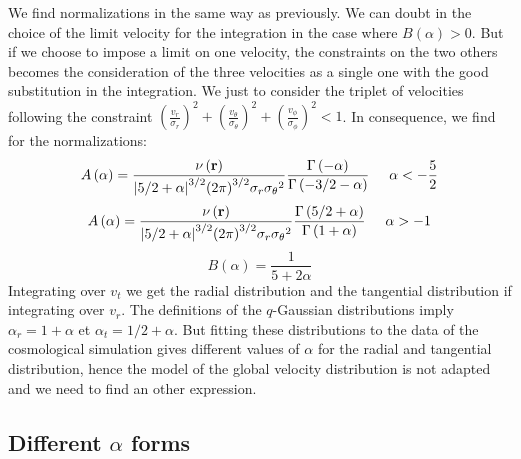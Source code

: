 We find normalizations in the same way as previously. We can doubt in the
choice of the limit velocity for the integration in the case where
$B\left(\alpha\right)>0$. But if we choose to impose a limit on one
velocity, the constraints on the two others becomes the consideration of the
three velocities as a single one with the good substitution in the
integration. We just to consider the triplet of velocities following the
constraint ${\left(\frac{v_r}{\sigma_r}\right)}^2+
{\left(\frac{v_\theta}{\sigma_\theta}\right)}^2+
{\left(\frac{v_\phi}{\sigma_\phi}\right)}^2<1$. In consequence, we find for
the normalizations:
%
\begin{equation}
    A\left(\alpha\right)=
    \frac{\nu\left(\textbf{r}\right)}
    {{\left|5/2+\alpha\right|}^{3/2}{\left(2\pi\right)}^{3/2}
        \sigma_r{\sigma_\theta}^2}
    \frac{\Gamma\left(-\alpha\right)}
        {\Gamma\left(-3/2-\alpha\right)}\hspace{0.5cm}\alpha<-\frac{5}{2}
\end{equation}
%
\begin{equation}
    A\left(\alpha\right)=
    \frac{\nu\left(\textbf{r}\right)}
    {{\left|5/2+\alpha\right|}^{3/2}{\left(2\pi\right)}^{3/2}
    \sigma_r{\sigma_\theta}^2}
    \frac{\Gamma\left(5/2+\alpha\right)}{\Gamma\left(1+\alpha\right)}
    \hspace{0.5cm}\alpha>-1
\end{equation}
%
\begin{equation}
    B\left(\alpha\right)=\frac{1}{5+2\alpha}
\end{equation}
%
Integrating over $v_t$ we get the radial distribution and the tangential
distribution if integrating over $v_r$. The definitions of the $q$-Gaussian
distributions imply $\alpha_r=1+\alpha$ et $\alpha_t=1/2+\alpha$. But
fitting these distributions to the data of the cosmological simulation gives
different values of $\alpha$ for the radial and tangential distribution,
hence the model of the global velocity distribution is not adapted and we
need to find an other expression.


\subsection{Different $\alpha$ forms}
\label{sub:different_alpha_forms}


